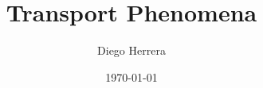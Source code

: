 %
\author[D. Herrera]{Diego Herrera}
\title[Transport]{Transport Phenomena}
\date{\today}
%
%
\makeatletter
{}
\makeatother
%
\renewcommand{\PrelimWords}
    {Transport -- D. Herrera -- Version 1.0.0}
%
